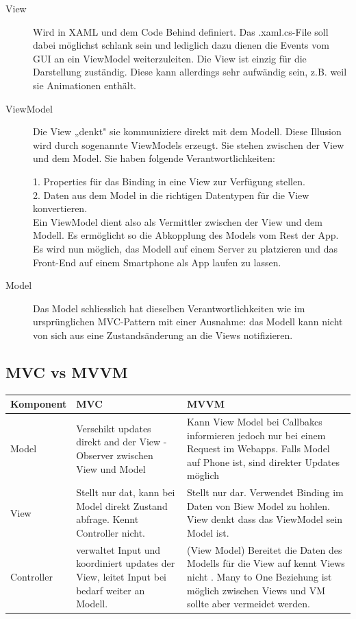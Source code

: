 \documentclass[a4paper,10pt]{scrreprt}
\begin{document}
\begin{description}
\item[View ]Wird in XAML und dem Code Behind definiert. Das .xaml.cs-File soll dabei möglichst schlank sein
und lediglich dazu dienen die Events vom GUI an ein ViewModel weiterzuleiten. Die View ist
einzig für die Darstellung zuständig. Diese kann allerdings sehr aufwändig sein, z.B. weil sie
Animationen enthält.

\item[ViewModel] Die View „denkt" sie kommuniziere direkt mit dem Modell. Diese Illusion wird durch
sogenannte ViewModels erzeugt. Sie stehen zwischen der View und dem Model. Sie haben
folgende Verantwortlichkeiten:

1. Properties für das Binding in eine View zur Verfügung stellen.\\
2. Daten aus dem Model in die richtigen Datentypen für die View konvertieren.\\
Ein ViewModel dient also als Vermittler zwischen der View und dem Modell. Es ermöglicht so
die Abkopplung des Models vom Rest der App. Es wird nun möglich, das Modell auf einem
Server zu platzieren und das Front-End auf einem Smartphone als App laufen zu lassen.

\item[Model] Das Model schliesslich hat dieselben Verantwortlichkeiten wie im ursprünglichen MVC-Pattern
mit einer Ausnahme: das Modell kann nicht von sich aus eine Zustandsänderung an die Views
notifizieren.

\end{description}

\subsection{MVC vs MVVM}

\begin{tabular}{|l | p{7cm} | p{7cm}|}
 \hline
\textbf{Komponent} & \textbf{MVC} & \textbf{MVVM} \\ \hline
Model &  Verschikt updates direkt and der View - Observer zwischen View und 
Model & Kann View Model bei Callbakcs informieren jedoch nur bei einem Request im Webapps. Falls Model auf Phone ist,
sind direkter Updates möglich \\ \hline
View & Stellt nur dat, kann bei Model direkt Zustand abfrage. Kennt Controller nicht. & Stellt nur dar. Verwendet 
Binding im Daten von Biew Model zu 
hohlen. View denkt dass das ViewModel sein Model ist.\\ \hline
Controller & verwaltet Input und koordiniert updates der View, leitet Input bei bedarf weiter an Modell. & (View Model) 
Bereitet die Daten des 
Modells für die View auf kennt Views nicht . Many to One Beziehung ist möglich zwischen Views und VM sollte aber 
vermeidet werden. \\ \hline

\end{tabular}
\end{document}
